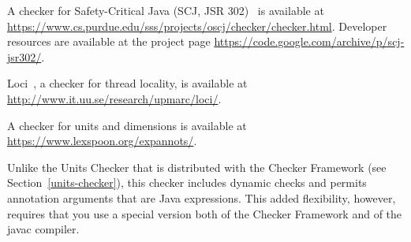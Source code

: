 
A checker for Safety-Critical Java (SCJ, JSR 302)~\cite{TangPJ2010} is available at
\url{https://www.cs.purdue.edu/sss/projects/oscj/checker/checker.html}.
Developer resources are available at the project page
\url{https://code.google.com/archive/p/scj-jsr302/}.








Loci~\cite{WrigstadPMZV2009}, a checker for thread locality, is available at
\url{http://www.it.uu.se/research/upmarc/loci/}.









A checker for units and dimensions is available at
\url{https://www.lexspoon.org/expannots/}.

Unlike the Units Checker that is distributed with the Checker Framework
(see Section~\ref{units-checker}), this checker includes dynamic checks and
permits annotation arguments that are Java expressions.  This added
flexibility, however, requires that you use a special version both of the
Checker Framework and of the javac compiler.




